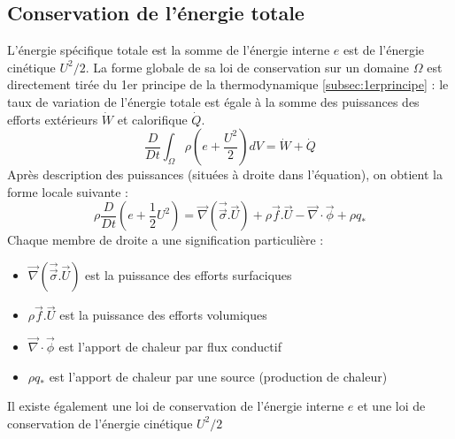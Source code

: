 \subsection{Conservation de l'énergie totale}
L'énergie spécifique totale est la somme de l'énergie interne $e$ est de l'énergie cinétique $U^2/2$. La forme globale de sa loi de conservation sur un domaine $\Omega$ est directement tirée du 1er principe de la thermodynamique \ref{subsec:1erprincipe} : le taux de variation de l'énergie totale est égale à la somme des puissances des efforts extérieurs $\dot{W}$ et calorifique $\dot{Q}$.
%
\begin{equation}
    \frac{D}{Dt} \int_{\Omega} \rho \left( e + \frac{U^2}{2} \right) dV = \dot{W} + \dot{Q}
\end{equation}
%
Après description des puissances (situées à droite dans l'équation), on obtient la forme locale suivante :
%
\begin{equation}
    \rho \frac{D}{Dt} \left( e + \frac{1}{2}U^2 \right)
    = \vec{\nabla} \left( \vec{\vec{\sigma}} . \vec{U} \right)
    + \rho \vec{f} . \vec{U}
    - \vec{\nabla} \cdot \vec{\phi}
    + \rho q_*
\end{equation}
%
Chaque membre de droite a une signification particulière :
%
\begin{itemize}
    \item $\vec{\nabla} \left( \vec{\vec{\sigma}} . \vec{U} \right)$ est la puissance des efforts surfaciques
    \item $\rho \vec{f} . \vec{U}$ est la puissance des efforts volumiques
    \item $\vec{\nabla} \cdot \vec{\phi}$ est l'apport de chaleur par flux conductif
    \item $\rho q_*$ est l'apport de chaleur par une source (production de chaleur)
\end{itemize}

Il existe également une loi de conservation de l'énergie interne $e$ et une loi de conservation de l'énergie cinétique $U^2/2$
